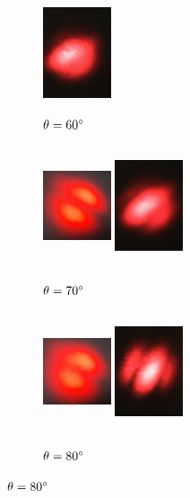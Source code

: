 \documentclass[12pt]{book}
\begin{document}
\begin{figure}[H]
\begin{subfigure}[b]{0.3\linewidth}
\includegraphics[width=2cm,height=3.5cm]{images/fotos/42.jpg}
\caption{$\theta=60\degree$}
\end{subfigure}
\begin{subfigure}[b]{0.3\linewidth}
\centering
\includegraphics[width=2cm,height=3.5cm]{images/fotos/91.jpg}
\includegraphics[width=2cm,height=3.5cm]{images/fotos/32.jpg}
\caption{$\theta=70\degree$}
\end{subfigure}
\begin{subfigure}[b]{0.3\linewidth}
\centering
\includegraphics[width=2cm,height=3.5cm]{images/fotos/101.jpg}
\includegraphics[width=2cm,height=3.5cm]{images/fotos/22.jpg}
\caption{$\theta=80\degree$}
\end{subfigure}

\end{figure}
\end{document}
